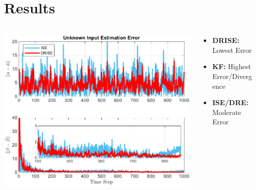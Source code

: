 \documentclass[handout, aspectratio=169]{beamer}
\begin{document}
\section{Results}
\begin{frame}
    \frametitle{}
    \begin{columns}[T]
        \begin{column}{0.5\textwidth} %
            \includegraphics[width=\textwidth]{figs/AttackEstimationError.pdf} %
        \end{column}
        \begin{column}{0.5\textwidth} %
            \begin{tcolorbox}[colbacktitle=title1, title=\textbf{Analysis}]
                \begin{itemize}
                 \item<1-> \textbf{DRISE:} Lowest Error \pause
                    \item<2-> \textbf{KF:} Highest Error/Divergence \pause
                    \item<3-> \textbf{ISE/DRE:} Moderate Error \pause 
                \end{itemize}
            \end{tcolorbox}
        \end{column}
    \end{columns}
\end{frame}
\end{document}

